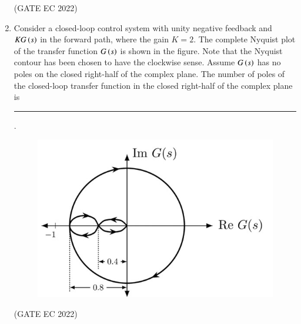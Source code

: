 \documentclass[journal,12pt,onecolumn]{IEEEtran}
\theoremstyle{remark}
\begin{document}
\begin{enumerate}
    \hfill{(GATE EC 2022)}
    \begin{enumerate}
    \end{enumerate}

    \item Consider a closed-loop control system with unity negative feedback and $KG\left(s\right)$ in the forward path, where the gain $K=2$. The complete Nyquist plot of the transfer function $G\left(s\right)$ is shown in the figure. Note that the Nyquist contour has been chosen to have the clockwise sense. Assume $G\left(s\right)$ has no poles on the closed right-half of the complex plane. The number of poles of the closed-loop transfer function in the closed right-half of the complex plane is \rule{2cm}{0.4pt}.
    \begin{figure}[H]
        \centering
        \includegraphics[width=0.5\columnwidth]{figs/m10.jpg}
        \caption*{}
        \label{fig:m10}
    \end{figure}

    \hfill{(GATE EC 2022)}
    \begin{enumerate}
    \end{enumerate}


\end{enumerate}
\end{document}
